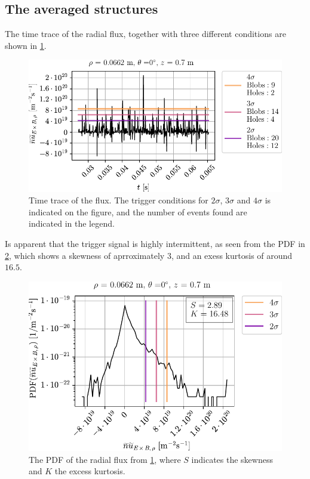 \subsection{The averaged structures}
The time trace of the radial flux, together with three different conditions are shown in \cref{fig:blobFluxTT}.
%
\begin{figure}[htb]
    \begin{center}
        \includegraphics{fig/results/blobs/blobFluxTimeTrace_B0_008Tweak}
    \end{center}
    \caption{
        Time trace of the flux.
        The trigger conditions for $2\sigma$, $3\sigma$ and $4\sigma$ is indicated on the figure, and the number of events found are indicated in the legend.
    }
    \label{fig:blobFluxTT}
\end{figure}
%
Is apparent that the trigger signal is highly intermittent, as seen from the PDF in \cref{fig:blobFluxPDF}, which shows a skewness of aprroximately $3$, and an exess kurtosis of around $16.5$.
%
\begin{figure}[htb]
    \begin{center}
        \includegraphics{fig/results/blobs/blobFluxPDF_B0_008Tweak}
    \end{center}
    \caption{
        The PDF of the radial flux from \cref{fig:blobFluxTT}, where $S$ indicates the skewness and $K$ the excess kurtosis.
    }
    \label{fig:blobFluxPDF}
\end{figure}
